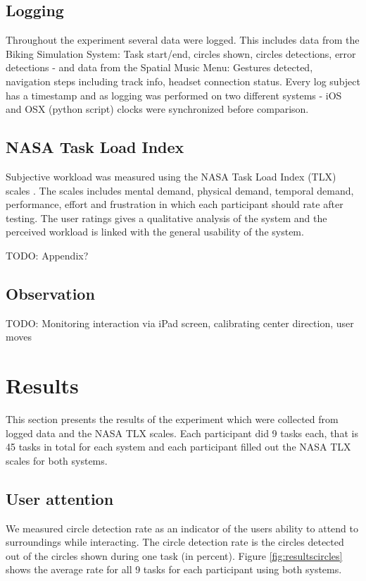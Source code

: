 \subsection{Logging}
Throughout the experiment several data were logged. This includes data from the Biking Simulation System: Task start/end, circles shown, circles detections, error detections - and data from the Spatial Music Menu: Gestures detected, navigation steps including track info, headset connection status. Every log subject has a timestamp and as logging was performed on two different systems - iOS and OSX (python script) clocks were synchronized before comparison.


\subsection{NASA Task Load Index}
Subjective workload was measured using the NASA Task Load Index (TLX) scales \cite{hart_workload_1990}. The scales includes mental demand, physical demand, temporal demand, performance, effort and frustration in which each participant should rate after testing. The user ratings gives a qualitative analysis of the system and the perceived workload is linked with the general usability of the system.

TODO: Appendix?

\subsection{Observation}

TODO: Monitoring interaction via iPad screen, calibrating center direction, user moves


\section{Results}
This section presents the results of the experiment which were collected from logged data and the NASA TLX scales. Each participant did 9 tasks each, that is 45 tasks in total for each system and each participant filled out the NASA TLX scales for both systems.

\subsection{User attention}
We measured circle detection rate as an indicator of the users ability to attend to surroundings while interacting. The circle detection rate is the circles detected out of the circles shown during one task (in percent). Figure \ref{fig:resultscircles} shows the average rate for all 9 tasks for each participant using both systems.

